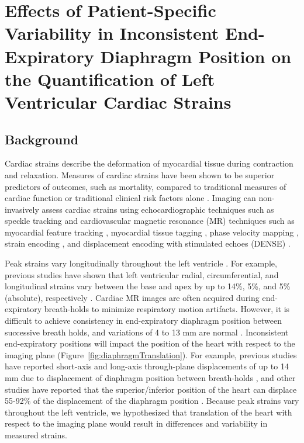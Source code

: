 \chapter{Effects of Patient-Specific Variability in Inconsistent End-Expiratory Diaphragm Position on the Quantification of Left Ventricular Cardiac Strains}

\section{Background}
	Cardiac strains describe the deformation of myocardial tissue during contraction and relaxation. Measures of cardiac strains have been shown to be superior predictors of outcomes, such as mortality, compared to traditional measures of cardiac function or traditional clinical risk factors alone \cite{Stanton2009}. Imaging can non-invasively assess cardiac strains using echocardiographic techniques such as speckle tracking \cite{Amundsen2006} and cardiovascular magnetic resonance (MR) techniques such as myocardial feature tracking \cite{Hor2010}, myocardial tissue tagging \cite{Axel1989,Zerhouni1988}, phase velocity mapping \cite{Pelc1994}, strain encoding \cite{Osman2001}, and displacement encoding with stimulated echoes (DENSE) \cite{Aletras1999b,Aletras1999c}.

	Peak strains vary longitudinally throughout the left ventricle \cite{Kuijer2002,Moore2000,Young1994a,Feng2009,NasiraeiMoghaddam2010,Donekal2013a,Suever2017}. For example, previous studies have shown that left ventricular radial, circumferential, and longitudinal strains vary between the base and apex by up to 14\%, 5\%, and 5\% (absolute), respectively \cite{Kuijer2002,Moore2000,Young1994a,Feng2009,NasiraeiMoghaddam2010,Donekal2013a,Suever2017}. Cardiac MR images are often acquired during end-expiratory breath-holds to minimize respiratory motion artifacts. However, it is difficult to achieve consistency in end-expiratory diaphragm position between successive breath holds, and variations of 4 to 13 mm are normal \cite{Liu1993,Wang1995a,Taylor1997a,Holland1998c,Fischer2006a}. Inconsistent end-expiratory positions will impact the position of the heart with respect to the imaging plane (Figure~\ref{fig:diaphragmTranslation}). For example, previous studies have reported short-axis and long-axis through-plane displacements of up to 14 mm due to displacement of diaphragm position between breath-holds \cite{Slomka2007,Swingen2003}, and other studies have reported that the superior/inferior position of the heart can displace 55-92\% of the displacement of the diaphragm position \cite{Wang1995b,McLeish2002}. Because peak strains vary throughout the left ventricle, we hypothesized that translation of the heart with respect to the imaging plane would result in differences and variability in measured strains.

